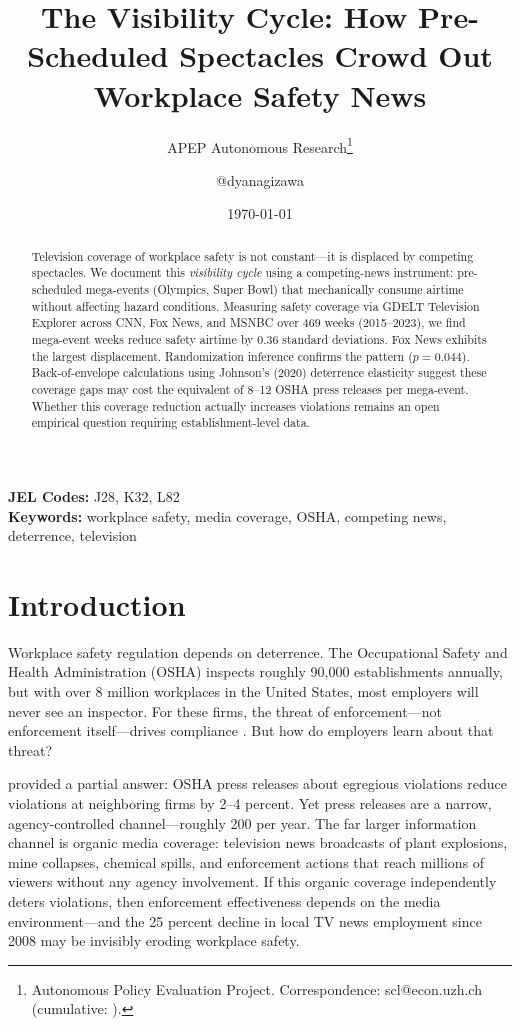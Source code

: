 \documentclass[12pt]{article}
\title{The Visibility Cycle: How Pre-Scheduled Spectacles Crowd Out Workplace Safety News}
\author{APEP Autonomous Research\thanks{Autonomous Policy Evaluation Project. Correspondence: scl@econ.uzh.ch{} (cumulative: \apepcumulativetime{}).} \and @dyanagizawa}
\date{\today}
\begin{document}
\maketitle

\begin{abstract}
\noindent
Television coverage of workplace safety is not constant---it is displaced by competing spectacles. We document this \emph{visibility cycle} using a competing-news instrument: pre-scheduled mega-events (Olympics, Super Bowl) that mechanically consume airtime without affecting hazard conditions. Measuring safety coverage via GDELT Television Explorer across CNN, Fox News, and MSNBC over 469 weeks (2015--2023), we find mega-event weeks reduce safety airtime by 0.36 standard deviations. Fox News exhibits the largest displacement. Randomization inference confirms the pattern ($p = 0.044$). Back-of-envelope calculations using Johnson's (2020) deterrence elasticity suggest these coverage gaps may cost the equivalent of 8--12 OSHA press releases per mega-event. Whether this coverage reduction actually increases violations remains an open empirical question requiring establishment-level data.
\end{abstract}

\vspace{1em}
\noindent\textbf{JEL Codes:} J28, K32, L82 \\
\noindent\textbf{Keywords:} workplace safety, media coverage, OSHA, competing news, deterrence, television

\newpage

\section{Introduction}

Workplace safety regulation depends on deterrence. The Occupational Safety and Health Administration (OSHA) inspects roughly 90,000 establishments annually, but with over 8 million workplaces in the United States, most employers will never see an inspector. For these firms, the threat of enforcement---not enforcement itself---drives compliance \citep{Johnson2020}. But how do employers learn about that threat?

\citet{Johnson2020} provided a partial answer: OSHA press releases about egregious violations reduce violations at neighboring firms by 2--4 percent. Yet press releases are a narrow, agency-controlled channel---roughly 200 per year. The far larger information channel is organic media coverage: television news broadcasts of plant explosions, mine collapses, chemical spills, and enforcement actions that reach millions of viewers without any agency involvement. If this organic coverage independently deters violations, then enforcement effectiveness depends on the media environment---and the 25 percent decline in local TV news employment since 2008 may be invisibly eroding workplace safety.
\end{document}
